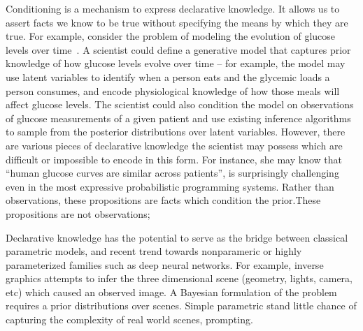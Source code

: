 

Conditioning is a mechanism to express declarative knowledge.
It allows us to assert facts we know to be true without specifying the means by which they are true.
For example, consider the problem of modeling the evolution of glucose levels over time~\citep{levine2017offline}.
A scientist could define a generative model that captures prior knowledge of how glucose levels evolve over time -- for example, the model may use latent variables to identify when a person eats and the glycemic loads a person consumes, and encode physiological knowledge of how those meals will affect glucose levels.
The scientist could also condition the model on observations of glucose measurements of a given patient and use existing inference algorithms to sample from the posterior distributions over latent variables.
However, there are various pieces of declarative knowledge the scientist may possess which are difficult or impossible to encode in this form.
For instance, she may know that ``human glucose curves are similar across patients'',   is surprisingly challenging even in the most expressive probabilistic programming systems. 
Rather than observations, these propositions are facts which condition the prior.These propositions are not observations; 

Declarative knowledge has the potential to serve as the bridge between classical parametric models, and recent trend towards nonparameric or highly parameterized families such as deep neural networks.
For example, inverse graphics attempts to infer the three dimensional scene (geometry, lights, camera, etc) which caused an observed image.
A Bayesian formulation of the problem requires a prior distributions over scenes.
Simple parametric stand little chance of capturing the complexity of real world scenes, prompting.




